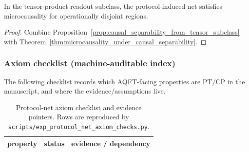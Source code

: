 \begin{corollary}
\label{cor:microcausality_tensor_subclass}
\MathTag In the tensor-product readout subclass, the protocol-induced net satisfies microcausality for operationally disjoint regions.
\end{corollary}
\begin{proof}
Combine Proposition~\ref{prop:causal_separability_from_tensor_subclass} with Theorem~\ref{thm:microcausality_under_causal_separability}.
\end{proof}

\subsubsection{Axiom checklist (machine-auditable index)}
\AuditTag The following checklist records which AQFT-facing properties are PT/CP in the manuscript, and where the evidence/assumptions live.

\begin{table}[H]
\centering
\small
\setlength{\tabcolsep}{10pt}
\renewcommand{\arraystretch}{1.15}
\begin{tabular}{p{3.2cm} p{2.2cm} p{8.8cm}}
\toprule
property & status & evidence / dependency \\
\midrule
%
\end{tabular}
\caption{Protocol-net axiom checklist and evidence pointers. Rows are reproduced by \texttt{scripts/exp\_protocol\_net\_axiom\_checks.py}.}
\label{tab:protocol_net_axiom_checks}
\end{table}

